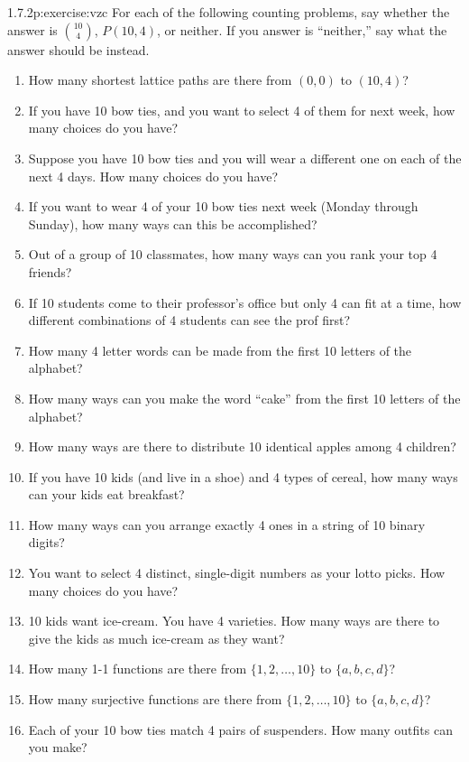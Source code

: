 \documentclass[twoside,11pt,]{book}
\numberwithin{equation}{chapter}
\begin{document}
\begin{divisionsolution}{1.7.2}{}{p:exercise:vzc}%
For each of the following counting problems, say whether the answer is \({10\choose 4}\), \(P(10,4)\), or neither. If you answer is ``neither,'' say what the answer should be instead.%
\begin{enumerate}[label=(\alph*)]
\item{}How many shortest lattice paths are there from \((0,0)\) to \((10,4)\)?%
\item{}If you have 10 bow ties,  and you want to select 4 of them for next week, how many choices do you have?%
\item{}Suppose you have 10 bow ties and you will wear a different one on each of the next 4 days. How many choices do you have?%
\item{}If you want to wear 4 of your 10 bow ties next week (Monday through Sunday), how many ways can this be accomplished?%
\item{}Out of a group of 10 classmates, how many ways can you rank your top 4 friends?%
\item{}If 10 students come to their professor's office but only 4 can fit at a time, how different combinations of 4 students can see the prof first?%
\item{}How many 4 letter words can be made from the first 10 letters of the alphabet?%
\item{}How many ways can you make the word ``cake'' from the first 10 letters of the alphabet?%
\item{}How many ways are there to distribute 10 identical apples among 4 children?%
\item{}If you have 10 kids (and live in a shoe) and 4 types of cereal, how many ways can your kids eat breakfast?%
\item{}How many ways can you arrange exactly 4 ones in a string of 10 binary digits?%
\item{}You want to select 4 distinct, single-digit numbers as your lotto picks. How many choices do you have?%
\item{}10 kids want ice-cream. You have 4 varieties. How many ways are there to give the kids as much ice-cream as they want?%
\item{}How many 1-1 functions are there from \(\{1,2,\ldots, 10\}\) to \(\{a,b,c,d\}\)?%
\item{}How many surjective functions are there from \(\{1,2,\ldots, 10\}\) to \(\{a,b,c,d\}\)?%
\item{}Each of your 10 bow ties match 4 pairs of suspenders. How many outfits can you make?%

\end{enumerate}
\end{divisionsolution}
\end{document}

